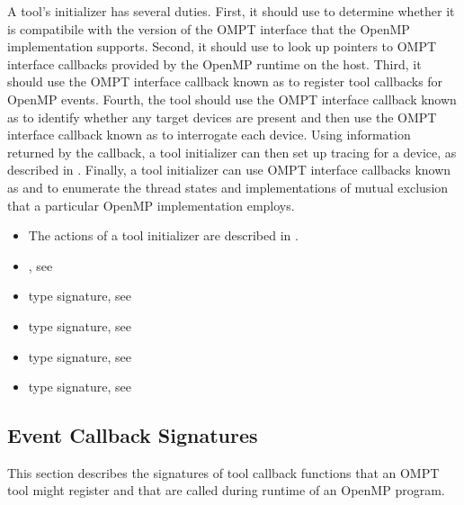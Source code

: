 \effect
A tool's initializer has several duties.  First, it should use
 to determine whether it is compatibile
with the version of the OMPT interface that the OpenMP implementation
supports.  Second, it should use  
to look up pointers to OMPT interface callbacks provided by the
OpenMP runtime on the host. 
Third, it should use the OMPT interface 
callback known as  
to register tool callbacks for OpenMP events.  Fourth, the tool
should use the OMPT interface callback known as  
to identify whether any target devices are present
and then use the OMPT interface callback known as 
 to interrogate each device.
Using information returned by the  callback,
a tool initializer can then set up tracing for a device, 
as described in . 
Finally, a tool initializer can use OMPT interface callbacks known as 
 and  to
enumerate the thread states and implementations of mutual exclusion
that a particular OpenMP implementation employs.

\crossreferences
\begin{itemize}
\item The actions of a tool initializer are described in 
.
\item {}, see 
\item {} type signature, see 
\item {} type signature, see 
\item {} type signature, see 
\item {} type signature, see 
\end{itemize}


\subsection{Event Callback Signatures}
\label{sec:ToolsSupport_callback_signatures}

This section describes the signatures of tool callback functions that an OMPT
tool might register and that are called during runtime of an OpenMP program.

